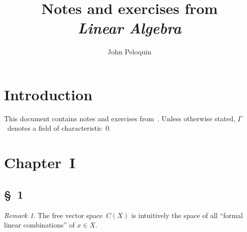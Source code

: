 \documentclass[letterpaper,12pt]{article}
\title{Notes and exercises from\\\textit{Linear Algebra}}
\author{John Peloquin}
\date{}
\theoremstyle{definition}
\theoremstyle{remark}
\newtheorem*{rmk}{Remark}
\begin{document}
\maketitle

\section*{Introduction}
This document contains notes and exercises from~\cite{greub}. Unless otherwise stated, \(\Gamma\)~denotes a field of characteristic~\(0\).

\section*{Chapter~I}
\subsection*{\S~1}
\begin{rmk}
The free vector space~\(C(X)\) is intuitively the space of all ``formal linear combinations'' of \(x\in X\).
\end{rmk}
\end{document}
